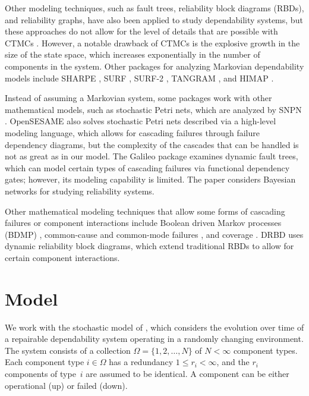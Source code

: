 \documentclass[12pt]{article}
\begin{document}
Other modeling techniques, such as fault trees, reliability block diagrams
(RBDs), and reliability graphs, have also been applied to study dependability
systems, but these approaches do not allow for the level of details that are
possible with CTMCs \cite{MFT:2000}. However, a notable drawback of CTMCs is
the explosive growth in the size of the state space, which increases
exponentially in the number of components in the system. Other packages for
analyzing Markovian dependability models include SHARPE \cite{STP:1996}, SURF
\cite{Butl:1986}, SURF-2 \cite{SURF2:1993}, TANGRAM \cite{BSM:1991}, and HIMAP
\cite{KGS:1996}.

Instead of assuming a Markovian system, some packages work with other
mathematical models, such as stochastic Petri nets, which are analyzed by SNPN
\cite{HTT:2000}. OpenSESAME \cite{WSB:2008} also solves stochastic Petri nets
described via a high-level modeling language, which allows for cascading
failures through failure dependency diagrams, but the complexity of the
cascades that can be handled is not as great as in our model. The Galileo
package \cite{SDC:1999} examines dynamic fault trees, which can model certain
types of cascading failures via functional dependency gates; however, its
modeling capability is limited. The paper \cite{LaPo:2007} considers Bayesian
networks for studying reliability systems.

Other mathematical modeling techniques that allow some forms of cascading
failures or component interactions include Boolean driven Markov processes
(BDMP)
\cite{BoBo:2003},
common-cause and common-mode failures
\cite{ALRL:2004,BCS:1969},
and coverage
\cite{DuTr:1989}.
DRBD \cite{XXR:2009} uses dynamic reliability block diagrams, which extend
traditional RBDs to allow for certain component interactions.

\section{Model}
\label{sec:model}

We work with the stochastic model of \cite{ING:2009}, which considers the
evolution over time of a repairable dependability system operating in a randomly
changing environment. The system consists of a collection $\Omega = \{ 1, 2,
\ldots, N \}$ of $N < \infty$ component types. Each component type $i \in
\Omega$ has a redundancy $1 \leq r_i < \infty$, and the $r_i$ components of
type~$i$ are assumed to be identical. A component can be either operational (up)
or failed (down).
\end{document}
